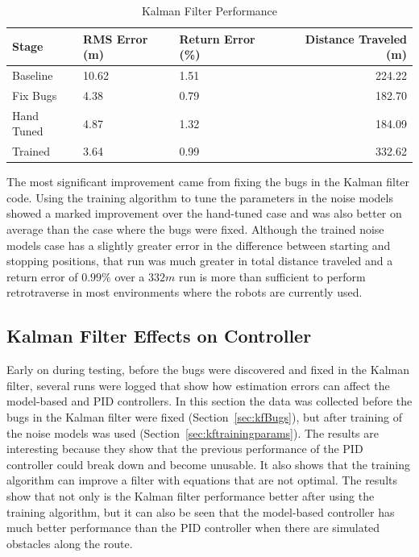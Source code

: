 \begin{table}[ht!]
\caption{Kalman Filter Performance}
\small
\centering
\begin{tabular}{@{}lllr@{}} \toprule
Stage      & RMS Error (m)  & Return Error (\%) & Distance Traveled (m) \\ \midrule
Baseline   & 10.62          & 1.51              & 224.22 \\
Fix Bugs   & 4.38           & 0.79              & 182.70 \\
Hand Tuned & 4.87           & 1.32              & 184.09 \\
Trained    & 3.64           & 0.99              & 332.62 \\ \bottomrule
\end{tabular}
\label{tab:resultsKF}
\end{table}

The most significant improvement came from fixing the bugs in the Kalman filter code. Using the training algorithm to tune the parameters in the noise models showed a marked improvement over the hand-tuned case and was also better on average than the case where the bugs were fixed. Although the trained noise models case has a slightly greater error in the difference between starting and stopping positions, that run was much greater in total distance traveled and a return error of $0.99\%$ over a $332m$ run is more than sufficient to perform retrotraverse in most environments where the robots are currently used.

\subsection{Kalman Filter Effects on Controller}
Early on during testing, before the bugs were discovered and fixed in the Kalman filter, several runs were logged that show how estimation errors can affect the model-based and PID controllers. In this section the data was collected before the bugs in the Kalman filter were fixed (Section~\ref{sec:kfBugs}), but after training of the noise models was used (Section~\ref{sec:kftrainingparams}). The results are interesting because they show that the previous performance of the PID controller could break down and become unusable. It also shows that the training algorithm can improve a filter with equations that are not optimal. The results show that not only is the Kalman filter performance better after using the training algorithm, but it can also be seen that the model-based controller has much better performance than the PID controller when there are simulated obstacles along the route.

